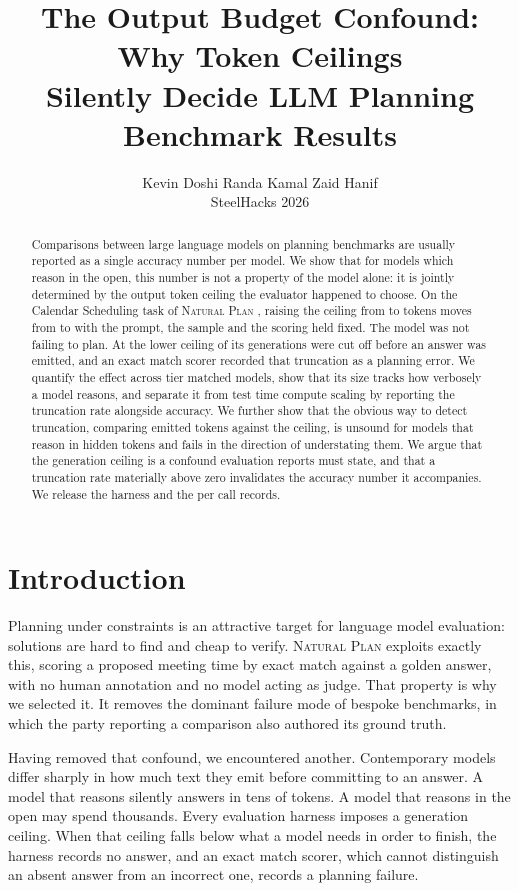 \documentclass[10pt,twocolumn]{article}
\title{\vspace{-1.5em}\textbf{The Output Budget Confound: Why Token Ceilings\\
Silently Decide LLM Planning Benchmark Results}}
\author{Kevin Doshi \quad Randa Kamal \quad Zaid Hanif\\\small SteelHacks 2026}
\date{}
\begin{document}
\maketitle

\begin{abstract}
\noindent
Comparisons between large language models on planning benchmarks are usually
reported as a single accuracy number per model. We show that for models which
reason in the open, this number is not a property of the model alone: it is
jointly determined by the output token ceiling the evaluator happened to choose.
On the Calendar Scheduling task of \textsc{Natural Plan} \cite{zheng2024naturalplan},
raising the ceiling from \tokenLowBudget{} to \tokenHighBudget{} tokens moves
\nemotronName{} from \nemotronLowAcc{} to \nemotronHighAcc{} with the prompt, the
sample and the scoring held fixed. The model was not failing to plan. At the
lower ceiling \nemotronTruncLow{} of its generations were cut off before an
answer was emitted, and an exact match scorer recorded that truncation as a
planning error. We quantify the effect across tier matched models, show that its
size tracks how verbosely a model reasons, and separate it from test time
compute scaling by reporting the truncation rate alongside accuracy. We further
show that the obvious way to detect truncation, comparing emitted tokens against
the ceiling, is unsound for models that reason in hidden tokens and fails in the
direction of understating them. We
argue that the generation ceiling is a confound evaluation reports must state,
and that a truncation rate materially above zero invalidates the accuracy number
it accompanies. We release the harness and the per call records.
\end{abstract}

\section{Introduction}

Planning under constraints is an attractive target for language model
evaluation: solutions are hard to find and cheap to verify. \textsc{Natural
Plan} \cite{zheng2024naturalplan} exploits exactly this, scoring a proposed
meeting time by exact match against a golden answer, with no human annotation
and no model acting as judge. That property is why we selected it. It removes
the dominant failure mode of bespoke benchmarks, in which the party reporting a
comparison also authored its ground truth.

Having removed that confound, we encountered another. Contemporary models differ
sharply in how much text they emit before committing to an answer. A model that
reasons silently answers in tens of tokens. A model that reasons in the open may
spend thousands. Every evaluation harness imposes a generation ceiling. When
that ceiling falls below what a model needs in order to finish, the harness
records no answer, and an exact match scorer, which cannot distinguish an absent
answer from an incorrect one, records a planning failure.
\end{document}
